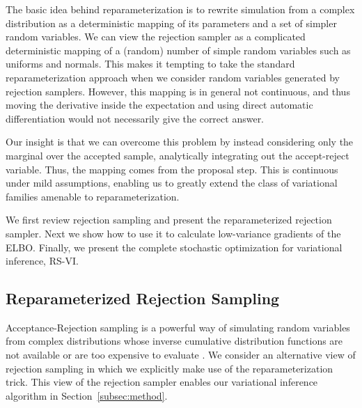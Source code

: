 The basic idea behind reparameterization is to rewrite simulation from a complex distribution as a deterministic mapping of its parameters and a set of simpler random variables. We can view the rejection sampler as a complicated deterministic mapping of a (random) number of simple random variables such as uniforms and normals. This makes it tempting to take the standard reparameterization approach when we consider random variables generated by rejection samplers. However, this mapping is in general not continuous, and thus moving the derivative inside the expectation and using direct automatic differentiation would not necessarily give the correct answer.

Our insight is that we can overcome this problem by instead considering only the marginal over the accepted sample, analytically integrating out the accept-reject variable. Thus, the mapping comes from the proposal step. This is continuous under mild assumptions, enabling us to greatly extend the class of variational families amenable to reparameterization.

We first review rejection sampling and present the reparameterized rejection sampler. Next we show how to use it to calculate low-variance gradients of the \gls{ELBO}. Finally, we present the complete stochastic optimization for variational inference, \gls{RS-VI}.

\subsection{Reparameterized Rejection Sampling}
Acceptance-Rejection sampling is a powerful way of simulating random variables from complex distributions whose inverse cumulative distribution functions are not available or are too expensive to evaluate \citep{devroye1986,robert2004monte}. We consider an alternative view of rejection sampling in which we explicitly make use of the reparameterization trick. This view of the rejection sampler enables our variational inference algorithm in Section~\ref{subsec:method}. 

